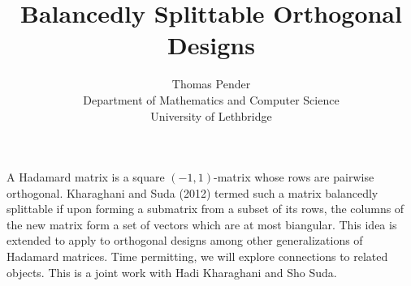 \documentclass[a4paper]{article}
\title{Balancedly Splittable Orthogonal Designs}
\author{Thomas Pender\\Department of Mathematics and Computer
  Science\\University of Lethbridge}
\date{}
\begin{document}
\maketitle 

A Hadamard matrix is a square $(-1,1)$-matrix whose rows are pairwise
orthogonal. Kharaghani and Suda (2012) termed such a matrix balancedly
splittable if upon forming a submatrix from a subset of its rows, the columns of
the new matrix form a set of vectors which are at most biangular. This idea is
extended to apply to orthogonal designs among other generalizations of
Hadamard matrices. Time permitting, we will explore connections to related
objects. This is a joint work with Hadi Kharaghani and Sho Suda.
\end{document}

